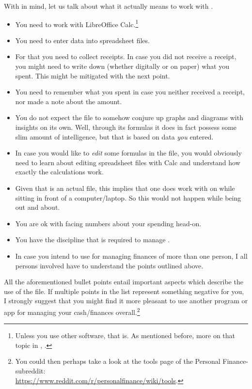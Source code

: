 With  in mind, let us talk about what it actually means to work with \tfn.
\begin{itemize}
	\item You need to work with LibreOffice Calc.\footnote{Unless you use other software, that is.
	As mentioned before, more on that topic in , .}
	\item You need to enter data into spreadsheet files.
	\item For that you need to collect receipts.
	In case you did not receive a receipt, you might need to write down (whether digitally or on paper) what you spent.
	This might be mitigated with the next point.
	\item You need to remember what you spent in case you neither received a receipt, nor made a note about the amount.
	\item You do not expect the file to somehow conjure up graphs and diagrams with insights on its own.
	Well, through its formulas it does in fact possess some slim amount of intelligence, but that is based on data \emph{you} entered.
	\item In case you would like to \emph{edit} some formulas in the file, you would obviously need to learn about editing spreadsheet files with Calc and understand how exactly the calculations work.
	\item Given that \tfn is an actual file, this implies that one does work with on while sitting in front of a computer/laptop.
	So this would not happen while being out and about.
	\item You are ok with facing numbers about your spending head-on.
	\item You have the discipline that is required to manage \tfn.
	\item In case you intend to use \tfn for managing finances of more than one person, I all persons involved have to understand the points outlined above.
\end{itemize}
All the aforementioned bullet points entail important aspects which describe the use of the file.
If multiple points in the list represent something negative for you, I strongly suggest that you might find it more pleasant to use another program or app for managing your cash/finances overall.\footnote{You could then perhaps take a look at the tools page of the Personal Finance-subreddit:\\
\href{https://www.reddit.com/r/personalfinance/wiki/tools}{https://www.reddit.com/r/personalfinance/wiki/tools}.}

